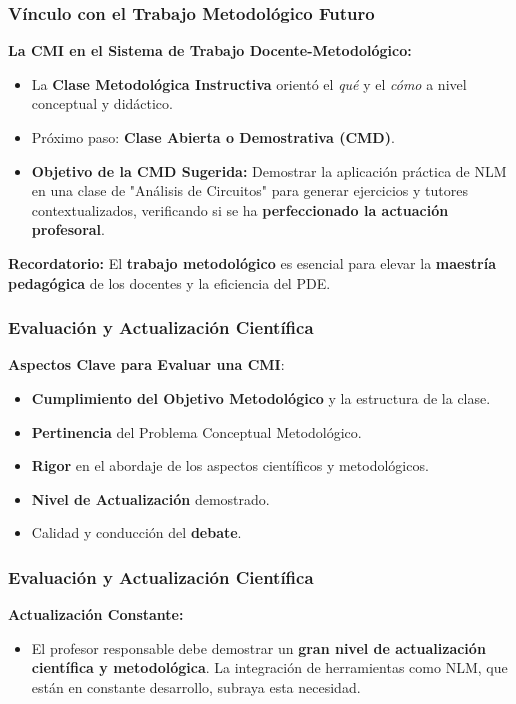 \documentclass[aspectratio=43]{beamer}
\begin{document}
\begin{frame}
\frametitle{ Vínculo con el Trabajo Metodológico Futuro}

\textbf{La CMI en el Sistema de Trabajo Docente-Metodológico:}
\begin{itemize}
    \item La \textbf{Clase Metodológica Instructiva} orientó el \textit{qué} y el \textit{cómo} a nivel conceptual y didáctico.
    \item Próximo paso: \textbf{Clase Abierta o Demostrativa (CMD)}.
    \item \textbf{Objetivo de la CMD Sugerida:} Demostrar la aplicación práctica de NLM en una clase de "Análisis de Circuitos" para generar ejercicios y tutores contextualizados, verificando si se ha \textbf{perfeccionado la actuación profesoral}.
\end{itemize}
\vfill
\textbf{Recordatorio:} El \textbf{trabajo metodológico} es esencial para elevar la \textbf{maestría pedagógica} de los docentes y la eficiencia del PDE.
\end{frame}

\begin{frame}
\frametitle{ Evaluación y Actualización Científica}

\textbf{Aspectos Clave para Evaluar una CMI}:
\begin{itemize}
    \item \textbf{Cumplimiento del Objetivo Metodológico} y la estructura de la clase.
    \item \textbf{Pertinencia} del Problema Conceptual Metodológico.
    \item \textbf{Rigor} en el abordaje de los aspectos científicos y metodológicos.
    \item \textbf{Nivel de Actualización} demostrado.
    \item Calidad y conducción del \textbf{debate}.
\end{itemize}
\end{frame}

\begin{frame}
\frametitle{ Evaluación y Actualización Científica}

\textbf{Actualización Constante:}
\begin{itemize}
    \item El profesor responsable debe demostrar un \textbf{gran nivel de actualización científica y metodológica}. La integración de herramientas como NLM, que están en constante desarrollo, subraya esta necesidad.
\end{itemize}
\end{frame}
\end{document}
